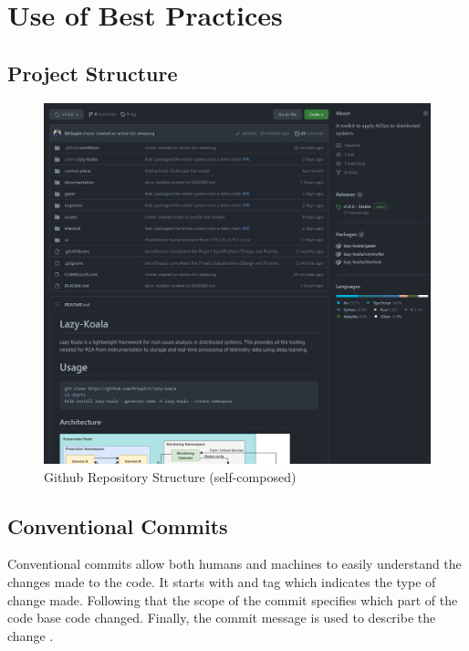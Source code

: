 \chapter{Use of Best Practices}\label{appendix:github}


\section{Project Structure}

\begin{figure}[H]
    \includegraphics[width=16.5cm]{assets/appendix/github.png}
    \caption{Github Repository Structure (self-composed)}
\end{figure}

\newpage

\section{Conventional Commits}

Conventional commits allow both humans and machines to easily understand the changes made to the code. It starts with and tag which indicates the type of change made. Following that the scope of the commit specifies which part of the code base code changed. Finally, the commit message is used to describe the change \citep{Conventi55:online}.

